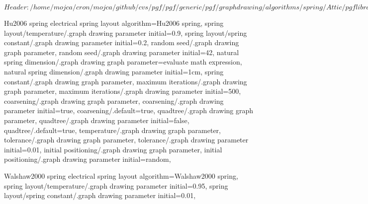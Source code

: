 %
%
%

\ProvidesFileRCS[v\pgfversion] $Header: /home/mojca/cron/mojca/github/cvs/pgf/pgf/generic/pgf/graphdrawing/algorithms/spring/Attic/pgflibrarygraphdrawing.spring.code.tex,v 1.6 2011/05/11 01:26:41 jannis-pohlmann Exp $





%
% 







%
%



%
% 
%
\pgfgddeclarealgorithmkey
  {Hu2006 spring electrical}
  {spring layout}
  {
    algorithm=Hu2006 spring,
    spring layout/temperature/.graph drawing parameter initial=0.9,
    spring layout/spring constant/.graph drawing parameter initial=0.2,
  }
  {
    random seed/.graph drawing graph parameter,
    random seed/.graph drawing parameter initial=42,
    natural spring dimension/.graph drawing graph parameter=evaluate math expression,
    natural spring dimension/.graph drawing parameter initial=1cm,
    spring constant/.graph drawing graph parameter,
    maximum iterations/.graph drawing graph parameter,
    maximum iterations/.graph drawing parameter initial=500,
    coarsening/.graph drawing graph parameter,
    coarsening/.graph drawing parameter initial=true,
    coarsening/.default=true,
    quadtree/.graph drawing graph parameter,
    quadtree/.graph drawing parameter initial=false,
    quadtree/.default=true,
    temperature/.graph drawing graph parameter,
    tolerance/.graph drawing graph parameter,
    tolerance/.graph drawing parameter initial=0.01,
    initial positioning/.graph drawing graph parameter,
    initial positioning/.graph drawing parameter initial=random,
  }



%
%
%
\pgfgddeclarealgorithmkey
  {Walshaw2000 spring electrical}
  {spring layout}
  {
    algorithm=Walshaw2000 spring,
    spring layout/temperature/.graph drawing parameter initial=0.95,
    spring layout/spring constant/.graph drawing parameter initial=0.01,
  }
  {}
